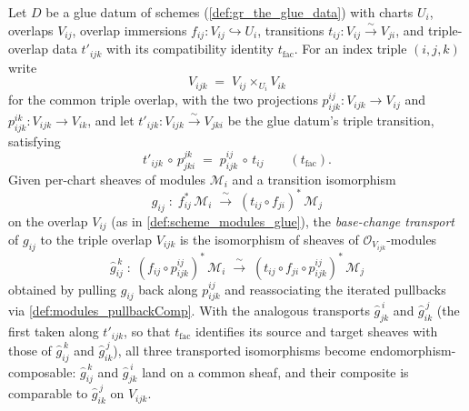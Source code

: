 \begin{lemma}\leanok
  \label{lem:modules_pullback_basechange_transport}
  Let \(D\) be a glue datum of schemes (\cref{def:gr_the_glue_data}) with charts
  \(U_i\), overlaps \(V_{ij}\), overlap immersions \(f_{ij} : V_{ij} \hookrightarrow
  U_i\), transitions \(t_{ij} : V_{ij} \xrightarrow{\sim} V_{ji}\), and triple-overlap
  data \(t'_{ijk}\) with its compatibility identity \(t_{\mathrm{fac}}\). For an index
  triple \((i,j,k)\) write
  \[
    V_{ijk} \;=\; V_{ij} \times_{U_i} V_{ik}
  \]
  for the common triple overlap, with the two projections
  \(p^{ij}_{ijk} : V_{ijk} \to V_{ij}\) and \(p^{ik}_{ijk} : V_{ijk} \to V_{ik}\), and
  let \(t'_{ijk} : V_{ijk} \xrightarrow{\sim} V_{jki}\) be the glue datum's triple
  transition, satisfying
  \[
    t'_{ijk} \,\circ\, p^{jk}_{jki} \;=\; p^{ij}_{ijk} \,\circ\, t_{ij}
    \qquad (t_{\mathrm{fac}}).
  \]
  Given per-chart sheaves of modules \(\mathcal{M}_i\) and a transition isomorphism
  \[
    g_{ij} \;:\; f_{ij}^{*}\,\mathcal{M}_i
      \;\xrightarrow{\ \sim\ }\;
    (t_{ij} \circ f_{ji})^{*}\,\mathcal{M}_j
  \]
  on the overlap \(V_{ij}\) (as in \cref{def:scheme_modules_glue}), the
  \emph{base-change transport} of \(g_{ij}\) to the triple overlap \(V_{ijk}\) is the
  isomorphism of sheaves of \(\mathcal{O}_{V_{ijk}}\)-modules
  \[
    \widehat{g}_{ij}^{\,k}
      \;:\;
    (f_{ij} \circ p^{ij}_{ijk})^{*}\,\mathcal{M}_i
      \;\xrightarrow{\ \sim\ }\;
    (t_{ij} \circ f_{ji} \circ p^{ij}_{ijk})^{*}\,\mathcal{M}_j
  \]
  obtained by pulling \(g_{ij}\) back along \(p^{ij}_{ijk}\) and reassociating the
  iterated pullbacks via \cref{def:modules_pullbackComp}. With the analogous transports
  \(\widehat{g}_{jk}^{\,i}\) and \(\widehat{g}_{ik}^{\,j}\) (the first taken along
  \(t'_{ijk}\), so that \(t_{\mathrm{fac}}\) identifies its source and target sheaves
  with those of \(\widehat{g}_{ij}^{\,k}\) and \(\widehat{g}_{ik}^{\,j}\)), all three
  transported isomorphisms become endomorphism-composable: \(\widehat{g}_{ij}^{\,k}\)
  and \(\widehat{g}_{jk}^{\,i}\) land on a common sheaf, and their composite is
  comparable to \(\widehat{g}_{ik}^{\,j}\) on \(V_{ijk}\).
\end{lemma}

